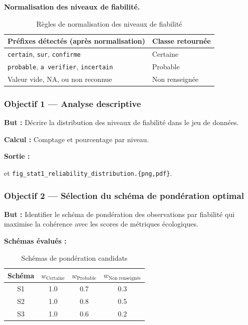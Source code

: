 \documentclass[11pt,a4paper]{article}
\begin{document}
\medskip
\noindent\textbf{Normalisation des niveaux de fiabilité.}\par

\begin{table}[htbp]
  \centering
  \caption{Règles de normalisation des niveaux de fiabilité}
  \begin{tabular}{ll}
    \toprule
    \textbf{Préfixes détectés (après normalisation)} & \textbf{Classe retournée} \\
    \midrule
    \texttt{certain}, \texttt{sur}, \texttt{confirme} & Certaine \\
    \texttt{probable}, \texttt{a verifier}, \texttt{incertain} & Probable \\
    Valeur vide, NA, ou non reconnue & Non renseignée \\
    \bottomrule
  \end{tabular}
\end{table}

\subsubsection{Objectif 1 — Analyse descriptive}

\textbf{But :} Décrire la distribution des niveaux de fiabilité dans le jeu de données.

\textbf{Calcul :} Comptage et pourcentage par niveau.

\textbf{Sortie :}  

et \texttt{fig\_stat1\_reliability\_distribution.\{png,pdf\}}.

\subsubsection{Objectif 2 — Sélection du schéma de pondération optimal}

\textbf{But :} Identifier le schéma de pondération des observations par fiabilité qui
maximise la cohérence avec les scores de métriques écologiques.

\textbf{Schémas évalués :}

\begin{table}[htbp]
  \centering
  \caption{Schémas de pondération candidats}
  \begin{tabular}{cccc}
    \toprule
    \textbf{Schéma} & \textbf{$w_{\text{Certaine}}$} & \textbf{$w_{\text{Probable}}$} & \textbf{$w_{\text{Non renseignée}}$} \\
    \midrule
    S1 & 1.0 & 0.7 & 0.3 \\
    S2 & 1.0 & 0.8 & 0.5 \\
    S3 & 1.0 & 0.6 & 0.2 \\
    \bottomrule
  \end{tabular}
\end{table}
\end{document}
